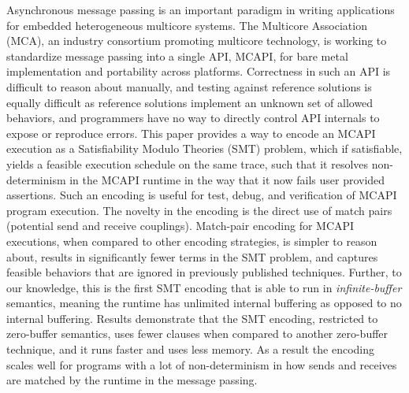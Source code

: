 
Asynchronous message passing is an important paradigm in writing
applications for embedded heterogeneous multicore systems.  The
Multicore Association (MCA), an industry consortium promoting
multicore technology, is working to standardize message passing into a
single API, MCAPI, for bare metal implementation and portability
across platforms.  Correctness in such an API is difficult to reason
about manually, and testing against reference solutions is equally
difficult as reference solutions implement an unknown set of allowed
behaviors, and programmers have no way to directly control API
internals to expose or reproduce errors.  This paper provides a way to
encode an MCAPI execution as a Satisfiability Modulo Theories (SMT)
problem, which if satisfiable, yields a feasible execution schedule on
the same trace, such that it resolves non-determinism in the MCAPI
runtime in the way that it now fails user provided assertions.  Such
an encoding is useful for test, debug, and verification of MCAPI
program execution.  The novelty in the encoding is the direct use of match
pairs (potential send and receive couplings).  Match-pair encoding for
MCAPI executions, when compared to other encoding strategies, is
simpler to reason about, results in significantly fewer terms in the
SMT problem, and captures feasible behaviors that are ignored in
previously published techniques. Further, to our knowledge, this is
the first SMT encoding that is able to run in \textit{infinite-buffer}
semantics, meaning the runtime has unlimited internal buffering as
opposed to no internal buffering. Results demonstrate that the SMT encoding, restricted to
zero-buffer semantics, uses fewer clauses when compared to another
zero-buffer technique, and it runs faster and uses less
memory. As a result the encoding scales well for
programs with a lot of non-determinism in how sends and receives are matched by the runtime in the message passing.

